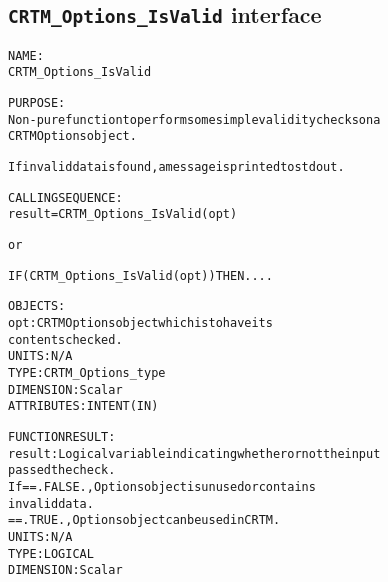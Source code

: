\subsection{\texttt{CRTM\_Options\_IsValid} interface}
  \label{sec:CRTM_Options_IsValid_interface}
  \begin{alltt}
 
  NAME:
        CRTM_Options_IsValid
 
  PURPOSE:
        Non-pure function to perform some simple validity checks on a
        CRTM Options object.
 
        If invalid data is found, a message is printed to stdout.
 
  CALLING SEQUENCE:
        result = CRTM_Options_IsValid( opt )
 
          or
 
        IF ( CRTM_Options_IsValid( opt ) ) THEN....
 
  OBJECTS:
        opt:       CRTM Options object which is to have its
                   contents checked.
                   UNITS:      N/A
                   TYPE:       CRTM_Options_type
                   DIMENSION:  Scalar
                   ATTRIBUTES: INTENT(IN)
 
  FUNCTION RESULT:
        result:    Logical variable indicating whether or not the input
                   passed the check.
                   If == .FALSE., Options object is unused or contains
                                  invalid data.
                      == .TRUE.,  Options object can be used in CRTM.
                   UNITS:      N/A
                   TYPE:       LOGICAL
                   DIMENSION:  Scalar
 
  \end{alltt}

